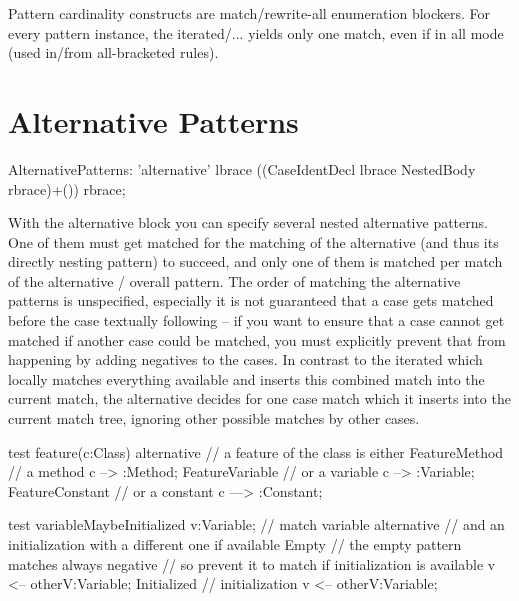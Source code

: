 \begin{warning}
Pattern cardinality constructs are match/rewrite-all enumeration blockers.
For every pattern instance, the iterated/... yields only one match, even if in all mode (used in/from all-bracketed rules).
\end{warning} 


\section{Alternative Patterns}
\label{alternative}

\begin{rail}  
  AlternativePatterns: 
    'alternative' lbrace ((CaseIdentDecl lbrace NestedBody rbrace)+()) rbrace;
\end{rail}

With the alternative block you can specify several nested alternative patterns. One of them must get matched for the matching of the alternative (and thus its directly nesting pattern) to succeed, and only one of them is matched per match of the alternative / overall pattern.
The order of matching the alternative patterns is unspecified, especially it is not guaranteed that a case gets matched before the case textually following -- if you want to ensure that a case cannot get matched if another case could be matched, you must explicitly prevent that from happening by adding negatives to the cases.
In contrast to the iterated which locally matches everything available and inserts this combined match into the current match, the alternative decides for one case match which it inserts into the current match tree, ignoring other possible matches by other cases. 

\begin{example}
  \begin{grgen}
test feature(c:Class)
{
  alternative // a feature of the class is either
  {
    FeatureMethod { // a method
      c --> :Method;
    }
    FeatureVariable { // or a variable
      c --> :Variable;
    }
    FeatureConstant { // or a constant
      c ---> :Constant;
    }
  }
}  
  \end{grgen}
\end{example}

\begin{example}
  \begin{grgen}
test variableMaybeInitialized
{
  v:Variable; // match variable
  alternative { // and an initialization with a different one if available
    Empty {
      // the empty pattern matches always
      negative { // so prevent it to match if initialization is available
        v <-- otherV:Variable;
      }
    }
    Initialized { // initialization
      v <-- otherV:Variable;
    }
  }
}
  \end{grgen}
\end{example}

